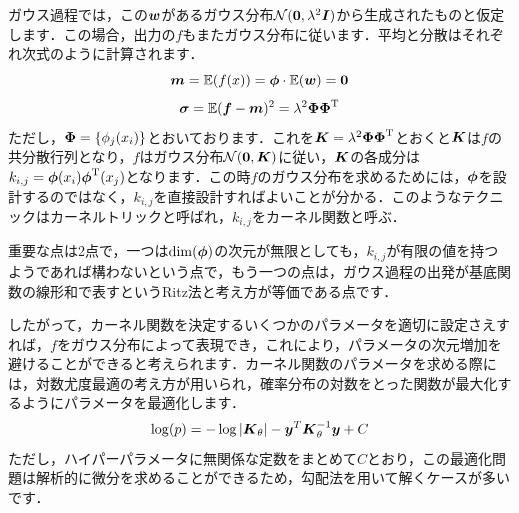 \documentclass[11pt]{jsarticle}
\begin{document}
			ガウス過程では，この$ \boldsymbol{w} $があるガウス分布$ \mathcal{N}(\boldsymbol{0},\lambda^2 \boldsymbol{I}) $から生成されたものと仮定します．この場合，出力の$ f $もまたガウス分布に従います．平均と分散はそれぞれ次式のように計算されます．
			\begin{equation}\label{eq:Avg}
				\boldsymbol{m} = \mathbb{E}(f(x)) = \boldsymbol{\phi} \cdot \mathbb{E}( \boldsymbol{w}) = \boldsymbol{0}
			\end{equation}
			\begin{equation}\label{eq:Var}
				\boldsymbol{\sigma} = \mathbb{E}(\boldsymbol{f} - \boldsymbol{m})^2 = \lambda^2  \boldsymbol{\Phi}  \boldsymbol{\Phi}^{\mathrm{T}}
			\end{equation}
			ただし，$ \boldsymbol{\Phi} =\{\phi_j(x_i) \}$とおいております．これを$ \boldsymbol{K} = \lambda^2  \boldsymbol{\Phi}  \boldsymbol{\Phi}^{\mathrm{T}} $とおくと$ \boldsymbol{K} $は$ f $の共分散行列となり，$ f $はガウス分布$ \mathcal{N}(\boldsymbol{0},\boldsymbol{K}) $に従い，$ \boldsymbol{K} $の各成分は$ k_{i,j} = \boldsymbol{\phi}(x_i) \boldsymbol{\phi}^{\mathrm{T}}(x_j) $となります．この時$ f $のガウス分布を求めるためには，$ \boldsymbol{\phi} $を設計するのではなく，$ k_{i,j} $を直接設計すればよいことが分かる．このようなテクニックはカーネルトリックと呼ばれ，$ k_{i,j} $をカーネル関数と呼ぶ．
			
			重要な点は2点で，一つは$ \dim(\boldsymbol{\phi}) $の次元が無限としても，$ k_{i,j} $が有限の値を持つようであれば構わないという点で，もう一つの点は，ガウス過程の出発が基底関数の線形和で表すというRitz法と考え方が等価である点です．
			
			したがって，カーネル関数を決定するいくつかのパラメータを適切に設定さえすれば，$ f $をガウス分布によって表現でき，これにより，パラメータの次元増加を避けることができると考えられます．カーネル関数のパラメータを求める際には，対数尤度最適の考え方が用いられ，確率分布の対数をとった関数が最大化するようにパラメータを最適化します．
			\begin{equation}\label{eq:Suudo}
			\log(p) = -\log|\boldsymbol{K}_{\theta}| - \boldsymbol{y}^T \boldsymbol{K}_{\theta}^{-1} \boldsymbol{y}+C
			\end{equation}
			ただし，ハイパーパラメータに無関係な定数をまとめて$ C $とおり，この最適化問題は解析的に微分を求めることができるため，勾配法を用いて解くケースが多いです．
			
\end{document}
